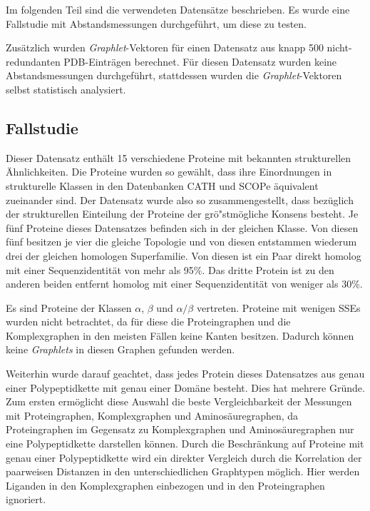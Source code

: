 \documentclass{report}
\begin{document}
Im folgenden Teil sind die verwendeten Datens\"atze beschrieben. Es wurde eine Fallstudie mit Abstandsmessungen durchgef\"uhrt, um diese zu testen.

Zus\"atzlich wurden \textit{Graphlet}-Vektoren f\"ur einen Datensatz aus knapp 500 nicht-redundanten PDB-Eintr\"agen berechnet. F\"ur diesen Datensatz wurden keine Abstandsmessungen durchgef\"uhrt, stattdessen wurden die \textit{Graphlet}-Vektoren selbst statistisch analysiert.


\subsection{Fallstudie}


Dieser Datensatz enth\"alt 15 verschiedene Proteine mit bekannten strukturellen \"Ahnlichkeiten. Die Proteine wurden so gew\"ahlt, dass ihre Einordnungen in strukturelle Klassen in den Datenbanken CATH \cite{cath} und SCOPe \cite{scope} \"aquivalent zueinander sind.
Der Datensatz wurde also so zusammengestellt, dass bez\"uglich der strukturellen Einteilung der Proteine der gr\"o"stm\"ogliche Konsens besteht.
Je f\"unf Proteine dieses Datensatzes befinden sich in der gleichen Klasse. Von diesen f\"unf besitzen je vier die gleiche Topologie und von diesen entstammen wiederum drei der gleichen homologen Superfamilie. Von diesen ist ein Paar direkt homolog mit einer Sequenzidentit\"at von mehr als 95\%. Das dritte Protein ist zu den anderen beiden entfernt homolog mit einer Sequenzidentit\"at von weniger als 30\%.

Es sind Proteine der Klassen $\alpha$, $\beta$ und $\alpha/\beta$ vertreten. Proteine mit wenigen SSEs wurden nicht betrachtet, da f\"ur diese die Proteingraphen und die Komplexgraphen in den meisten F\"allen keine Kanten besitzen. Dadurch k\"onnen keine \textit{Graphlets} in diesen Graphen gefunden werden.

Weiterhin wurde darauf geachtet, dass jedes Protein dieses Datensatzes aus genau einer Polypeptidkette mit genau einer Dom\"ane besteht. Dies hat mehrere Gr\"unde. Zum ersten erm\"oglicht diese Auswahl die beste Vergleichbarkeit der Messungen mit Proteingraphen, Komplexgraphen und Aminos\"auregraphen, da Proteingraphen im Gegensatz zu Komplexgraphen und Aminos\"auregraphen nur eine Polypeptidkette darstellen k\"onnen. Durch die Beschr\"ankung auf Proteine mit genau einer Polypeptidkette wird ein direkter Vergleich durch die Korrelation der paarweisen Distanzen in den unterschiedlichen Graphtypen m\"oglich. Hier werden Liganden in den Komplexgraphen einbezogen und in den Proteingraphen ignoriert.
\end{document}
